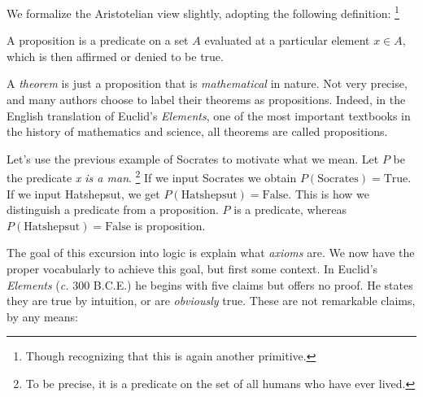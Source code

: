             We formalize the Aristotelian view slightly, adopting the
            following definition:%
            \footnote{%
                Though recognizing that this is again another primitive.
            }
            \begin{definition}
                \label{def:Proposition}%
                A \gls{proposition} is a \gls{predicate} on a \gls{set} $A$
                evaluated at a particular element $x\in{A}$, which is then
                affirmed or denied to be true.%
            \end{definition}
            A \textit{theorem} is just
            a proposition that is \textit{mathematical} in nature. Not very
            precise, and many authors choose to label their theorems as
            propositions. Indeed, in the English translation of Euclid's
            \textit{Elements}, one of the most important textbooks in the
            history of mathematics and science, all theorems are called
            propositions.
            \begin{example}
                Let's use the previous example of Socrates to motivate what we
                mean. Let $P$ be the predicate \textit{x is a man}.%
                \footnote{%
                    To be precise, it is a predicate on the set of all humans
                    who have ever lived.
                }
                If we input Socrates we obtain $P(\text{Socrates})=\text{True}$.
                If we input Hatshepsut, we get
                $P(\text{Hatshepsut})=\text{False}$. This is how we distinguish
                a predicate from a proposition. $P$ is a predicate, whereas
                $P(\text{Hatshepsut})=\text{False}$ is proposition.
            \end{example}
            The goal of this excursion into logic is explain what
            \textit{axioms} are.
            We now have the proper vocabularly to achieve
            this goal, but first some context.
            In Euclid's \textit{Elements} (\textit{c.} 300 B.C.E.)
            he begins
            with five claims but offers no proof. He states they are true by
            intuition, or are \textit{obviously} true. These are not remarkable
            claims, by any means:
